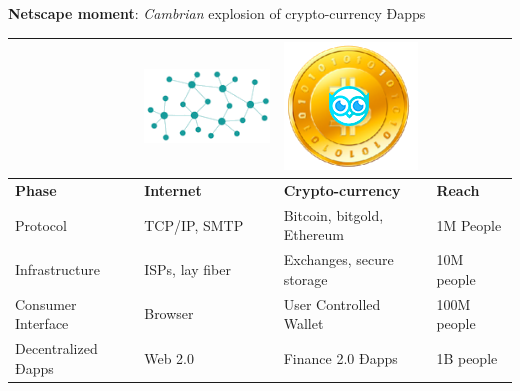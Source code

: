 \textbf{Netscape moment}: \emph{Cambrian} explosion of crypto-currency Ðapps
 
\begin{tabularx} {\textwidth}{|X|X|X|X|}
    \hline
&    \includegraphics[scale=0.3]{static/decentnew} &     \includegraphics[scale=0.3]{static/hootcoin} & \\
    \hline
\textbf{Phase} & \textbf{Internet} & \textbf{Crypto-currency} & \textbf{Reach}\\
\hline
Protocol & TCP/IP, SMTP & Bitcoin, bitgold, Ethereum & 1M People \\
\hline
Infrastructure & ISPs, lay fiber & Exchanges, secure storage & 10M people \\
\hline
Consumer Interface & Browser & User Controlled Wallet & 100M people \\
\hline
Decentralized Ðapps &  Web 2.0  & Finance 2.0 Ðapps & 1B people\\
\hline
\end{tabularx}